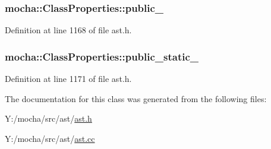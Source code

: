 \hypertarget{classmocha_1_1_class_properties_a2810f6c455558f888d81ee31401bf7a3}{
\subsubsection[{public\_\-}]{ {\bf mocha::ClassProperties::public\_\-}}}
\label{classmocha_1_1_class_properties_a2810f6c455558f888d81ee31401bf7a3}


Definition at line 1168 of file ast.h.

\hypertarget{classmocha_1_1_class_properties_af751d2300bd5a931f2d845dd2498b4e1}{
\subsubsection[{public\_\-static\_\-}]{ {\bf mocha::ClassProperties::public\_\-static\_\-}}}
\label{classmocha_1_1_class_properties_af751d2300bd5a931f2d845dd2498b4e1}


Definition at line 1171 of file ast.h.



The documentation for this class was generated from the following files:\begin{DoxyCompactItemize}
\item 
Y:/mocha/src/ast/\hyperlink{ast_8h}{ast.h}\item 
Y:/mocha/src/ast/\hyperlink{ast_8cc}{ast.cc}\end{DoxyCompactItemize}
